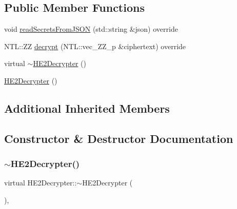 \subsection*{Public Member Functions}
\begin{DoxyCompactItemize}
\item 
void \hyperlink{classHE2Decrypter_a9cf1a6eae2667f6e891237589c4eeda0}{read\+Secrets\+From\+J\+S\+ON} (std\+::string \&json) override
\item 
N\+T\+L\+::\+ZZ \hyperlink{classHE2Decrypter_a766f96cb2277fd3e4af59ca44a32d519}{decrypt} (N\+T\+L\+::vec\+\_\+\+Z\+Z\+\_\+p \&ciphertext) override
\item 
virtual \hyperlink{classHE2Decrypter_a552592d927f1b051f38e32b2783e1bed}{$\sim$\+H\+E2\+Decrypter} ()
\item 
\hyperlink{classHE2Decrypter_a9ccbcb4de6bae54641e8777f9288d3f9}{H\+E2\+Decrypter} ()
\end{DoxyCompactItemize}
\subsection*{Additional Inherited Members}


\subsection{Constructor \& Destructor Documentation}
\mbox{\label{classHE2Decrypter_a552592d927f1b051f38e32b2783e1bed}} 
\subsubsection{\texorpdfstring{$\sim$\+H\+E2\+Decrypter()}{~HE2Decrypter()}}
{\footnotesize\ttfamily virtual H\+E2\+Decrypter\+::$\sim$\+H\+E2\+Decrypter (\begin{DoxyParamCaption}{ }\end{DoxyParamCaption})\hspace{0.3cm}{\ttfamily [inline]}, {\ttfamily [virtual]}}

\mbox{\label{classHE2Decrypter_a9ccbcb4de6bae54641e8777f9288d3f9}} 
